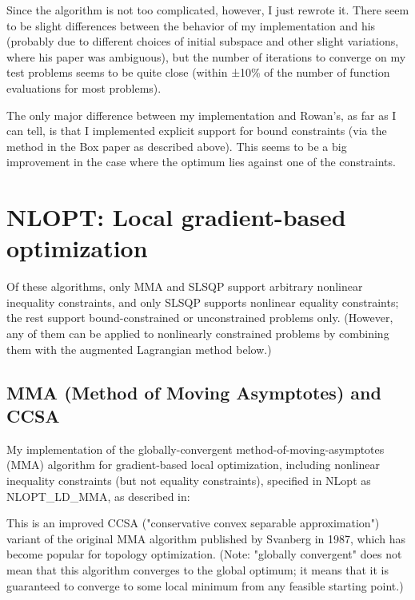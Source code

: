 Since the algorithm is not too complicated, however, I just rewrote it. There seem to be slight differences between the behavior of my implementation and his (probably due to different choices of initial subspace and other slight variations, where his paper was ambiguous), but the number of iterations to converge on my test problems seems to be quite close (within ±10\% of the number of function evaluations for most problems). 

The only major difference between my implementation and Rowan's, as far as I can tell, is that I implemented explicit support for bound constraints (via the method in the Box paper as described above). This seems to be a big improvement in the case where the optimum lies against one of the constraints. 




\section{NLOPT: Local gradient-based optimization}
\label{LocalGradientBasedOptimization}

Of these algorithms, only MMA and SLSQP support arbitrary nonlinear inequality constraints, and only SLSQP supports nonlinear equality constraints; the rest support bound-constrained or unconstrained problems only. (However, any of them can be applied to nonlinearly constrained problems by combining them with the augmented Lagrangian method below.) 


\subsection{MMA (Method of Moving Asymptotes) and CCSA}
My implementation of the globally-convergent method-of-moving-asymptotes (MMA) algorithm for gradient-based local optimization, including nonlinear inequality constraints (but not equality constraints), specified in NLopt as NLOPT\_LD\_MMA, as described in: \cite{Svanberg_2002}


This is an improved CCSA ("conservative convex separable approximation") variant of the original MMA algorithm published by Svanberg in 1987, which has become popular for topology optimization. (Note: "globally convergent" does not mean that this algorithm converges to the global optimum; it means that it is guaranteed to converge to some local minimum from any feasible starting point.) 

